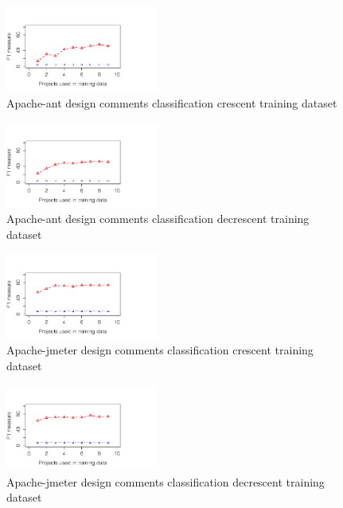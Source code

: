\begin{figure}[thb!]
	\label{fig:ant_design_crescent}
	\vspace{-3mm}
	\includegraphics[width=0.45\textwidth]{figures/ant_design_crescent}
	\caption{Apache-ant design comments classification crescent training dataset}
\end{figure}

\begin{figure}[thb!]
	\label{fig:ant_design_decrescent}
	\vspace{-13mm}
	\includegraphics[width=0.45\textwidth]{figures/ant_design_decrescent}
	\caption{Apache-ant design comments classification decrescent training dataset}
\end{figure}

\begin{figure}[thb!]
	\label{fig:jmeter_design_crescent}
	\vspace{-3mm}
	\includegraphics[width=0.45\textwidth]{figures/jmeter_design_crescent}
	\caption{Apache-jmeter design comments classification crescent training dataset}
\end{figure}

\begin{figure}[thb!]
	\label{fig:jmeter_design_decrescent}
	\vspace{-13mm}
	\includegraphics[width=0.45\textwidth]{figures/jmeter_design_decrescent}
	\caption{Apache-jmeter design comments classification decrescent training dataset}
\end{figure}

